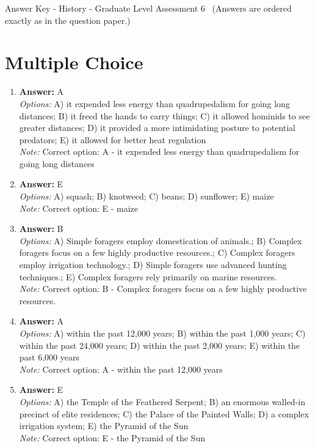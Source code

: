 \documentclass[12pt]{article}
\begin{document}
\begin{center}
Answer Key - History - Graduate Level Assessment 6 \
\small (Answers are ordered exactly as in the question paper.)
\end{center}

\section*{Multiple Choice}
\begin{enumerate}[label=\arabic*.]
\item \textbf{Answer:} A
\\ \textit{Options:} A) it expended less energy than quadrupedalism for going long distances; B) it freed the hands to carry things; C) it allowed hominids to see greater distances; D) it provided a more intimidating posture to potential predators; E) it allowed for better heat regulation
\\ \textit{Note:} Correct option: A - it expended less energy than quadrupedalism for going long distances
\item \textbf{Answer:} E
\\ \textit{Options:} A) squash; B) knotweed; C) beans; D) sunflower; E) maize
\\ \textit{Note:} Correct option: E - maize
\item \textbf{Answer:} B
\\ \textit{Options:} A) Simple foragers employ domestication of animals.; B) Complex foragers focus on a few highly productive resources.; C) Complex foragers employ irrigation technology.; D) Simple foragers use advanced hunting techniques.; E) Complex foragers rely primarily on marine resources.
\\ \textit{Note:} Correct option: B - Complex foragers focus on a few highly productive resources.
\item \textbf{Answer:} A
\\ \textit{Options:} A) within the past 12,000 years; B) within the past 1,000 years; C) within the past 24,000 years; D) within the past 2,000 years; E) within the past 6,000 years
\\ \textit{Note:} Correct option: A - within the past 12,000 years
\item \textbf{Answer:} E
\\ \textit{Options:} A) the Temple of the Feathered Serpent; B) an enormous walled-in precinct of elite residences; C) the Palace of the Painted Walls; D) a complex irrigation system; E) the Pyramid of the Sun
\\ \textit{Note:} Correct option: E - the Pyramid of the Sun
\end{enumerate}
\end{document}

